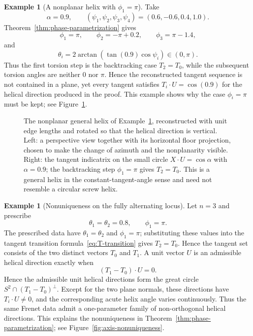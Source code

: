 \documentclass[10pt,a4paper]{amsart}
\theoremstyle{definition}
\newtheorem{example}[theorem]{Example}
\theoremstyle{remark}
\numberwithin{equation}{section}
\begin{document}
\begin{example}[A nonplanar helix with $\phi_1=\pi$]\label{ex:pi-helix}
Take
\[
\alpha=0.9,
\qquad
(\psi_1,\psi_2,\psi_3,\psi_4)=(0.6,-0.6,0.4,1.0).
\]
Theorem~\ref{thm:phase-parametrization} gives
\[
\phi_1=\pi,
\qquad
\phi_2=-\pi+0.2,
\qquad
\phi_3=\pi-1.4,
\]
and
\[
\theta_i=2\arctan(\tan(0.9)\cos\psi_i)\in(0,\pi).
\]
Thus the first torsion step is the backtracking case $T_2=T_0$, while the subsequent torsion angles are neither $0$ nor $\pi$. Hence the reconstructed tangent sequence is not contained in a plane, yet every tangent satisfies $T_i\cdot U=\cos(0.9)$ for the helical direction produced in the proof. This example shows why the case $\phi_i=\pi$ must be kept; see Figure~\ref{fig:pi-helix}.
\end{example}

\begin{figure}[!ht]
\centering
\resizebox{0.97\textwidth}{!}{}
\caption{The nonplanar general helix of Example~\ref{ex:pi-helix}, reconstructed with unit edge lengths and rotated so that the helical direction is vertical. Left: a perspective view together with its horizontal floor projection, chosen to make the change of azimuth and the nonplanarity visible. Right: the tangent indicatrix on the small circle $X\cdot U=\cos\alpha$ with $\alpha=0.9$; the backtracking step $\phi_1=\pi$ gives $T_2=T_0$. This is a general helix in the constant-tangent-angle sense and need not resemble a circular screw helix.}
\label{fig:pi-helix}
\end{figure}

\begin{example}[Nonuniqueness on the fully alternating locus]\label{ex:nonunique-axis}
Let $n=3$ and prescribe
\[
\theta_1=\theta_2=0.8,\qquad \phi_1=\pi.
\]
The prescribed data have $\theta_1=\theta_2$ and $\phi_1=\pi$; substituting these values into the tangent transition formula~\eqref{eq:T-transition} gives $T_2=T_0$. Hence the tangent set consists of the two distinct vectors $T_0$ and $T_1$. A unit vector $U$ is an admissible helical direction exactly when
\[
(T_1-T_0)\cdot U=0.
\]
Hence the admissible unit helical directions form the great circle $S^2\cap(T_1-T_0)^\perp$.  Except for the two plane normals, these directions have $T_i\cdot U\ne0$, and the corresponding acute helix angle varies continuously. Thus the same Frenet data admit a one-parameter family of non-orthogonal helical directions. This explains the nonuniqueness in Theorem~\ref{thm:phase-parametrization}; see Figure~\ref{fig:axis-nonuniqueness}.
\end{example}
\end{document}
